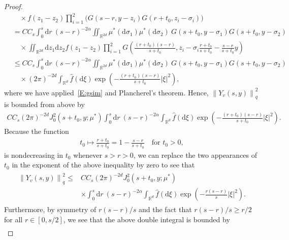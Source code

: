 \documentclass[sn-mathphys]{sn-jnl}%
\newcommand{\BR}{\mathbb{R}}
\newcommand{\Norm}[1]{\left\| #1 \right\|}
\newcommand{\ud}{\ensuremath{\mathrm{d}}}
\numberwithin{equation}{section}
\theoremstyle{thmstyleone}%
\theoremstyle{thmstyletwo}%
\theoremstyle{thmstylethree}%
\begin{document}
\begin{proof}
\begin{align*}
    & \quad \times f(z_1-z_2) \prod_{i = 1}^{2} \bigg(G(s-r,y-z_i)G(r + t_0,z_i-\sigma_i) \bigg)                                                                               \\
    & = C C_s\int_0^s \ud r \: (s-r)^{-2\alpha} \iint_{\BR^{2d}} \mu^* (\ud \sigma_1) \mu^* (\ud \sigma_2)\: G(s + t_0,y-\sigma_1)G(s + t_0,y-\sigma_2)                         \\
    & \quad \times\iint_{\BR^{2d}} \ud z_1\ud z_2 f(z_1-z_2) \prod_{i = 1}^2 G\left(\frac{(r+t_0)(s-r)}{s + t_0}, z_i-\sigma_i\frac{r + t_0}{s + t_0}-\frac{s-r}{s+t_0}y\right) \\
    & \le C C_s\int_0^s \ud r \: (s-r)^{-2\alpha} \iint_{\BR^{2d}}\mu^* (\ud \sigma_1) \mu^* (\ud \sigma_2)\: G(s + t_0,y-\sigma_1)G(s + t_0, y-\sigma_2)                       \\
    & \quad \times (2\pi)^{-2d} \int_{\BR^d} \widehat{f}(\ud \xi) \exp\left(-\frac{(r + t_0)(s-r)}{s+ t_0}\lvert\xi\rvert^2\right),
  \end{align*}
  where we have applied~\eqref{E:gsim} and Plancherel's theorem. Hence, $\Norm{Y_v(s,y)}_q^2$ is
  bounded from above by
  \begin{align*}
    C C_s (2\pi)^{-2d} J_0^2\left(s + t_0,y;\mu^*\right) \int_0^s \ud r \: (s-r)^{-2\alpha} \int_{\BR^d} \widehat{f}(\ud \xi)\exp\left(-\frac{(r + t_0)(s-r)}{s + t_0}\lvert\xi\rvert^2\right).
  \end{align*}
  Because the function
  \begin{align*}
    t_0 \mapsto \frac{r + t_0}{s + t_0} = 1- \frac{s-r}{s+t_0} \quad \text{for $t_0 > 0$},
  \end{align*}
  is nondecreasing in $t_0 $ whenever $s > r > 0$, we can replace the two appearances of $t_0$ in
  the exponent of the above inequality by zero to see that
  \begin{align}\label{E_:NormY}
    \begin{aligned}
      \Norm{Y_v(s,y)}_q^2 \le & C C_s (2\pi)^{-2d} J_0^2 (s + t_0,y;\mu^*) \\
                              & \times \int_0^s \ud r \: (s-r)^{-2\alpha} \int_{\BR^d} \widehat{f}(\ud \xi)\exp\left(-\frac{r(s-r)}{s}\lvert\xi\rvert^2\right).
    \end{aligned}
  \end{align}
  Furthermore, by symmetry of $r(s-r)/s$ and the fact that $r(s-r)/s \ge r/2$ for all $r\in
  [0,s/2]$, we see that the above double integral is bounded by
  \begin{align*}

\end{align*}
\end{proof}
\end{document}
